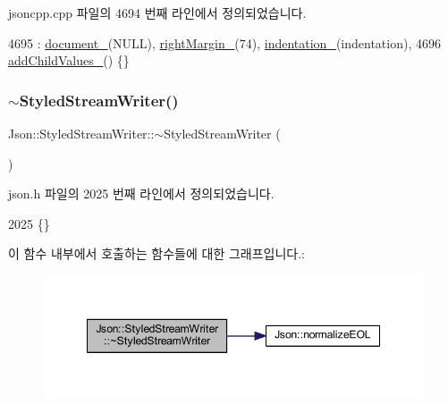 jsoncpp.\+cpp 파일의 4694 번째 라인에서 정의되었습니다.


\begin{DoxyCode}
4695     : \hyperlink{class_json_1_1_styled_stream_writer_aa8c4e4576f5c3dcb10955d133a092dd6}{document\_}(NULL), \hyperlink{class_json_1_1_styled_stream_writer_a94299ec0a9bb925b2dbbab7c1f2b390a}{rightMargin\_}(74), \hyperlink{class_json_1_1_styled_stream_writer_aa45d8fb4ca82d0550be9042012303713}{indentation\_}(indentation),
4696       \hyperlink{class_json_1_1_styled_stream_writer_a4e4bb7fc223b2652b72b523b1ce414fa}{addChildValues\_}() \{\}
\end{DoxyCode}
\mbox{\label{class_json_1_1_styled_stream_writer_a17444a59f617970279714e97b0ddfa46}} 
\subsubsection{\texorpdfstring{$\sim$\+Styled\+Stream\+Writer()}{~StyledStreamWriter()}}
{\footnotesize\ttfamily Json\+::\+Styled\+Stream\+Writer\+::$\sim$\+Styled\+Stream\+Writer (\begin{DoxyParamCaption}{ }\end{DoxyParamCaption})\hspace{0.3cm}{\ttfamily [inline]}}



json.\+h 파일의 2025 번째 라인에서 정의되었습니다.


\begin{DoxyCode}
2025 \{\}
\end{DoxyCode}
이 함수 내부에서 호출하는 함수들에 대한 그래프입니다.\+:\nopagebreak
\begin{figure}[H]
\begin{center}
\leavevmode
\includegraphics[width=348pt]{class_json_1_1_styled_stream_writer_a17444a59f617970279714e97b0ddfa46_cgraph}
\end{center}
\end{figure}


